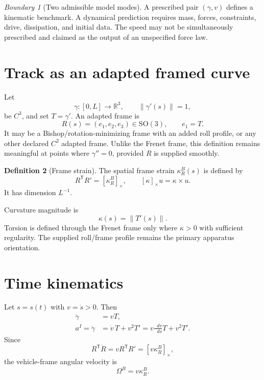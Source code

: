 \documentclass[11pt,a4paper]{article}
\theoremstyle{definition}
\newtheorem{definition}{Definition}[section]
\theoremstyle{plain}
\theoremstyle{remark}
\newtheorem{warning}[definition]{Boundary}
\newcommand{\R}{\mathbb{R}}
\newcommand{\dd}{\mathop{}\!d}
\newcommand{\norm}[1]{\left\lVert #1\right\rVert}
\newcommand{\SO}{\mathrm{SO}}
\newcommand{\crossop}[1]{\left[#1\right]_\times}
\begin{document}
\begin{warning}[Two admissible model modes]
A prescribed pair \((\gamma,v)\) defines a kinematic benchmark. A
dynamical prediction requires mass, forces, constraints, drive,
dissipation, and initial data. The speed may not be simultaneously
prescribed and claimed as the output of an unspecified force law.
\end{warning}

\section{Track as an adapted framed curve}

Let
\[
\gamma:[0,L]\to\R^3,\qquad
\norm{\gamma'(s)}=1,
\]
be \(C^3\), and set \(T=\gamma'\). An adapted frame is
\[
R(s)=(e_1,e_2,e_3)\in\SO(3),\qquad e_1=T.
\]
It may be a Bishop/rotation-minimizing frame with an added roll
profile, or any other declared \(C^2\) adapted frame. Unlike the
Frenet frame, this definition remains meaningful at points where
\(\gamma''=0\), provided \(R\) is supplied smoothly.

\begin{definition}[Frame strain]
The spatial frame strain \(\kappa_R^B(s)\) is defined by
\begin{equation}\label{eq:frame-strain}
R^{\mathsf T}R'=\crossop{\kappa_R^B},
\qquad
\crossop{\kappa}u=\kappa\times u .
\end{equation}
It has dimension \(L^{-1}\).
\end{definition}

Curvature magnitude is
\[
\kappa(s)=\norm{T'(s)}.
\]
Torsion is defined through the Frenet frame only where
\(\kappa>0\) with sufficient regularity. The supplied roll/frame
profile remains the primary apparatus orientation.

\section{Time kinematics}

Let \(s=s(t)\) with \(v=\dot s>0\). Then
\begin{align}
\dot\gamma&=vT,\\
a^I=\ddot\gamma
&=\dot v\,T+v^2T'
=v\frac{\dd v}{\dd s}T+v^2T'.
\label{eq:acceleration}
\end{align}
Since
\[
R^{\mathsf T}\dot R
=vR^{\mathsf T}R'
=\crossop{v\kappa_R^B},
\]
the vehicle-frame angular velocity is
\begin{equation}\label{eq:angular-velocity}
\Omega^B=v\kappa_R^B.
\end{equation}
\end{document}
